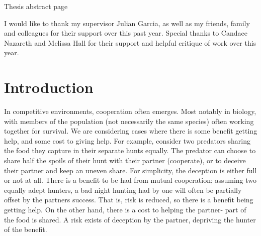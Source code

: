 \documentclass[a4paper,11pt,bcshonoursthesis,singlespace,twoside,thesisdraft,pdflatex]{cssethesis}
\begin{document}
\frontmatter					%

\thesistitlepage				%
\thesiscopyrightpage			%
\tableofcontents				%
\listoftables					%
\listoffigures					%

\begin{thesisabstract}			%
Thesis abstract page
\end{thesisabstract}                 

\thesisdeclarationpage			%

\begin{thesisacknowledgments}	%
I would like to thank my supervisor Julian Garcia, as well as my friends, family and colleagues for their support over this past year. Special thanks to Candace Nazareth and Melissa Hall for their support and helpful critique of work over this year.
\end{thesisacknowledgments}   

\mainmatter						%

\chapter{Introduction}
In competitive environments, cooperation often emerges. 
Most notably in biology, with members of the population (not necessarily the same species) often working together for survival. 
We are considering cases where there is some benefit getting help, and some cost to giving help. 
For example, consider two predators sharing the food they capture in their separate hunts equally. 
The predator can choose to share half the spoils of their hunt with their partner (cooperate), or to deceive their partner and keep an uneven share. 
For simplicity, the deception is either full or not at all. 
There is a benefit to be had from mutual cooperation; assuming two equally adept hunters, a bad night hunting had by one will often be partially offset by the partners success. 
That is, risk is reduced, so there is a benefit being getting help. 
On the other hand, there is a cost to helping the partner- part of the food is shared. A risk exists of deception by the partner, depriving the hunter of the benefit.  
 
\end{document}
